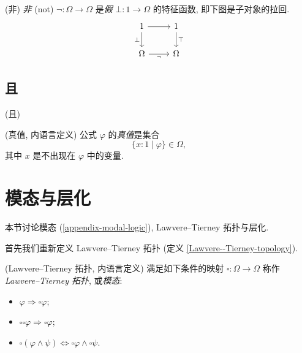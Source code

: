 \begin{definition}
	{(非)}
	\emph{非} (not) $\neg\colon \Omega\to\Omega$ 是\emph{假} $\bot\colon 1 \to\Omega$ 的特征函数, 即下图是子对象的拉回.
	\[\begin{tikzcd}[ampersand replacement=\&]
		1 \& 1 \\
		\Omega \& \Omega
		\arrow["\bot"', from=1-1, to=2-1]
		\arrow[from=1-1, to=1-2]
		\arrow["\neg"', from=2-1, to=2-2]
		\arrow["\top", from=1-2, to=2-2]
	\end{tikzcd}\]
\end{definition}

\subsection{且}

\begin{definition}
	{(且)}
	
\end{definition}

\begin{definition}
	{(真值, 内语言定义)}
	公式 $\varphi$ 的\emph{真值}是集合
	$$
	\{x:1 \mid \varphi\} \in \Omega,
	$$
	其中 $x$ 是不出现在 $\varphi$ 中的变量.
\end{definition}

\section{模态与层化}

本节讨论模态 (\ref{appendix-modal-logic}), Lawvere--Tierney 拓扑与层化.

首先我们重新定义 Lawvere--Tierney 拓扑 (定义 \ref{Lawvere--Tierney-topology}).

\begin{definition}
	{(Lawvere--Tierney 拓扑, 内语言定义)}
	满足如下条件的映射 $\square\colon \Omega\to\Omega$ 称作\emph{Lawvere--Tierney 拓扑}, 或\emph{模态}:
	\begin{itemize}
		\item $\varphi\Rightarrow \square \varphi$;
		\item $\square\square\varphi \Rightarrow \square\varphi$;
		\item $\square(\varphi \land \psi) \Leftrightarrow \square\varphi\land \square\psi$.
	\end{itemize}
\end{definition}

